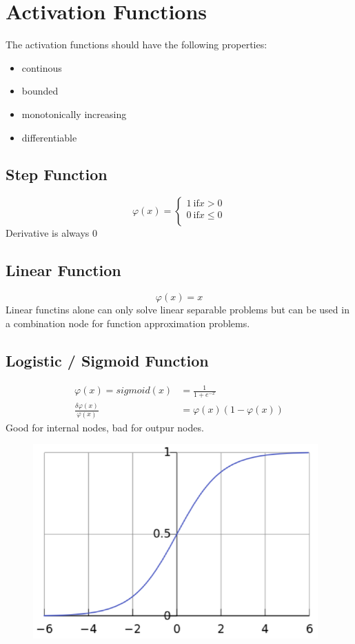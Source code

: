 \section{Activation Functions}
\label{sect:activation-functions}
The activation functions should have the following properties:
\begin{itemize}
	\item continous
	\item bounded
	\item monotonically increasing
	\item differentiable
\end{itemize}
\subsection{Step Function}
\label{ssect:linear-function}
\[
\varphi(x) = \begin{cases}
1 \: \text{if} x > 0 \\
0 \: \text{if} x \leq 0 \\
\end{cases}
\]
Derivative is always 0
\subsection{Linear Function}
\label{ssect:linear-function}
\[
\varphi(x) = x
\]
Linear functins alone can only solve linear separable problems but can be used in a combination node for function approximation problems.
\subsection{Logistic / Sigmoid Function}
\label{ssect:logistic-function}
\begin{align*}
\varphi(x) = sigmoid(x) &= \frac{1}{1 + e^{-x}} \\
\frac{\delta \varphi(x)}{\varphi(x)} &= \varphi(x) (1 - \varphi(x))
\end{align*}
Good for internal nodes, bad for outpur nodes.
\begin{figure}[h]
\includegraphics[scale=0.4]{sigmoid}
\end{figure}

